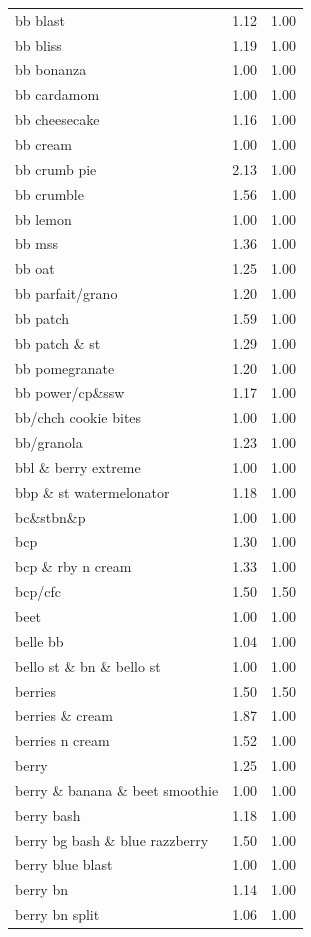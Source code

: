 \begin{table}
\begin{tabular}{lrr}
bb blast & 1.12 & 1.00 \\
bb bliss & 1.19 & 1.00 \\
bb bonanza & 1.00 & 1.00 \\
bb cardamom & 1.00 & 1.00 \\
bb cheesecake & 1.16 & 1.00 \\
bb cream & 1.00 & 1.00 \\
bb crumb pie & 2.13 & 1.00 \\
bb crumble & 1.56 & 1.00 \\
bb lemon & 1.00 & 1.00 \\
bb mss & 1.36 & 1.00 \\
bb oat & 1.25 & 1.00 \\
bb parfait/grano & 1.20 & 1.00 \\
bb patch & 1.59 & 1.00 \\
bb patch \& st & 1.29 & 1.00 \\
bb pomegranate & 1.20 & 1.00 \\
bb power/cp\&ssw & 1.17 & 1.00 \\
bb/chch cookie bites & 1.00 & 1.00 \\
bb/granola & 1.23 & 1.00 \\
bbl \& berry extreme & 1.00 & 1.00 \\
bbp \& st watermelonator & 1.18 & 1.00 \\
bc\&stbn\&p & 1.00 & 1.00 \\
bcp & 1.30 & 1.00 \\
bcp \& rby n cream & 1.33 & 1.00 \\
bcp/cfc & 1.50 & 1.50 \\
beet & 1.00 & 1.00 \\
belle bb & 1.04 & 1.00 \\
bello st \& bn \& bello st & 1.00 & 1.00 \\
berries & 1.50 & 1.50 \\
berries \& cream & 1.87 & 1.00 \\
berries n cream & 1.52 & 1.00 \\
berry & 1.25 & 1.00 \\
berry \& banana \& beet smoothie & 1.00 & 1.00 \\
berry bash & 1.18 & 1.00 \\
berry bg bash \& blue razzberry & 1.50 & 1.00 \\
berry blue blast & 1.00 & 1.00 \\
berry bn & 1.14 & 1.00 \\
berry bn split & 1.06 & 1.00 \\

\end{tabular}
\end{table}
